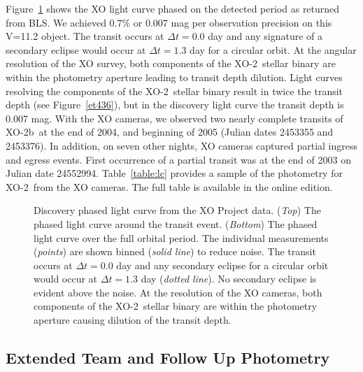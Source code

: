 \documentclass{emulateapj}
\newcommand{\xonb}{XO-2b}
\newcommand{\xon}{XO-2}
\begin{document}
Figure~\ref{xophased} shows the XO light curve phased on the detected
period as returned from BLS.  We achieved 0.7\% or 0.007 mag per
observation precision on this V=11.2 object.  The transit occurs at
$\Delta t=0.0$ day and any signature of a secondary eclipse would
occur at $\Delta t=1.3$ day for a circular orbit.  At the angular
resolution of the XO survey, both components of the \xon\ stellar
binary are within the photometry aperture leading to transit depth
dilution.  Light curves resolving the components of the \xon\ stellar
binary result in twice the transit depth (see Figure~\ref{et436}), but
in the discovery light curve the transit depth is 0.007 mag.  With the
XO cameras, we observed two nearly complete transits of \xonb\ at the end
of 2004, and beginning of 2005 (Julian dates 2453355 and
2453376).  In addition, on seven other nights, XO cameras captured
partial ingress and egress events.  First occurrence of a partial
transit was at the end of 2003 on Julian date 24552994.
Table~\ref{table:lc} provides a sample of the photometry for \xon\
from the XO cameras.  The full table is available in the online
edition.

\begin{figure}
\caption{Discovery phased light curve from the XO Project data.    ({\it Top}) The phased light curve around the transit event.  ({\it Bottom}) The phased light curve over the full orbital period.  The individual measurements ({\it points}) are shown binned ({\it solid line}) to reduce noise.  The transit occurs at $\Delta t=0.0$ day and any secondary eclipse for a circular orbit would occur at $\Delta t=1.3$ day ({\it dotted line}).  No secondary eclipse is evident above the noise.  At the resolution of the XO cameras, both components of the \xon\ stellar binary are within the photometry aperture causing dilution of the transit depth.\label{xophased}}
\end{figure}


\subsection{Extended Team and Follow Up Photometry}\label{sec:etphot}
\end{document}
